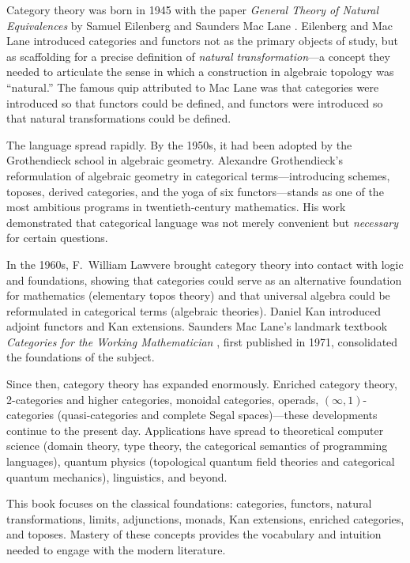 Category theory was born in 1945 with the paper \emph{General Theory of Natural Equivalences} by Samuel Eilenberg and Saunders Mac Lane \cite{EilenbergMacLane1945}. Eilenberg and Mac Lane introduced categories and functors not as the primary objects of study, but as scaffolding for a precise definition of \emph{natural transformation}—a concept they needed to articulate the sense in which a construction in algebraic topology was ``natural.'' The famous quip attributed to Mac Lane was that categories were introduced so that functors could be defined, and functors were introduced so that natural transformations could be defined.

The language spread rapidly. By the 1950s, it had been adopted by the Grothendieck school in algebraic geometry. Alexandre Grothendieck's reformulation of algebraic geometry in categorical terms—introducing schemes, toposes, derived categories, and the yoga of six functors—stands as one of the most ambitious programs in twentieth-century mathematics. His work demonstrated that categorical language was not merely convenient but \emph{necessary} for certain questions.

In the 1960s, F.\ William Lawvere brought category theory into contact with logic and foundations, showing that categories could serve as an alternative foundation for mathematics (elementary topos theory) and that universal algebra could be reformulated in categorical terms (algebraic theories). Daniel Kan introduced adjoint functors and Kan extensions. Saunders Mac Lane's landmark textbook \emph{Categories for the Working Mathematician} \cite{MacLane1998}, first published in 1971, consolidated the foundations of the subject.

Since then, category theory has expanded enormously. Enriched category theory, 2-categories and higher categories, monoidal categories, operads, $(\infty,1)$-categories (quasi-categories and complete Segal spaces)—these developments continue to the present day. Applications have spread to theoretical computer science (domain theory, type theory, the categorical semantics of programming languages), quantum physics (topological quantum field theories and categorical quantum mechanics), linguistics, and beyond.

This book focuses on the classical foundations: categories, functors, natural transformations, limits, adjunctions, monads, Kan extensions, enriched categories, and toposes. Mastery of these concepts provides the vocabulary and intuition needed to engage with the modern literature.

